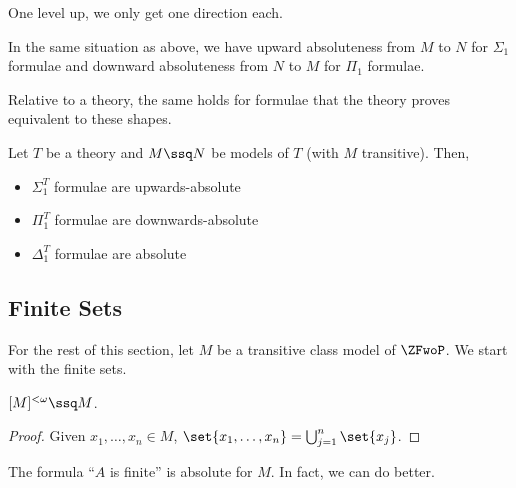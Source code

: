 One level up, we only get one direction each.

\begin{boxlemma}
    In the same situation as above, we have upward absoluteness from $M$ to $N$ for $\Sigma_1$ formulae and downward absoluteness from $N$ to $M$ for $\Pi_1$ formulae.
\end{boxlemma}

Relative to a theory, the same holds for formulae that the theory proves equivalent to these shapes.

\begin{boxlemma}
    Let $T$ be a theory and $M \ssq N$ be models of $T$ (with $M$ transitive). Then,
    \begin{itemize}
        \item $\Sigma_1^T$ formulae are upwards-absolute
        \item $\Pi_1^T$ formulae are downwards-absolute
        \item $\Delta_1^T$ formulae are absolute
    \end{itemize}
\end{boxlemma}

\subsection{Finite Sets}

For the rest of this section, let $M$ be a transitive class model of $\ZFwoP$. We start with the finite sets.

\begin{boxlemma}
    $[M]^{< \omega} \ssq M$.
\end{boxlemma}
\begin{proof}
    Given $x_1, \ldots, x_n \in M$, $\set{x_1, \ldots, x_n} = \bigcup_{j=1}^{n} \set{x_j}$.
\end{proof}

The formula ``$A$ is finite'' is absolute for $M$. In fact, we can do better.

